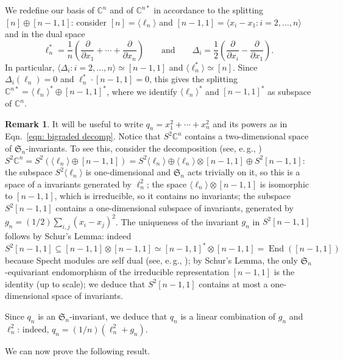 \documentclass[11pt]{article}
\numberwithin{equation}{section}
\theoremstyle{definition}
\newtheorem{remark}[theorem]{Remark}
\theoremstyle{plain}
\newcommand{\eg}{e.\,g.}
\newcommand{\vvirg}{ , \dots , }
\newcommand{\bbC}{\mathbb{C}}
\newcommand{\frakS}{\mathfrak{S}}
\DeclareMathOperator{\End}{End}
\begin{document}
We redefine our basis of $\bbC^n$ and of $\bbC^{n*}$ in accordance to the splitting $[n] \oplus [n-1,1]$: consider $[n] = \langle \ell_n\rangle$ and $[n-1,1] = \langle x_i - x_1 : i = 2 \vvirg n\rangle$ and in the dual space
\[
  \ell_n^* = \frac{1}{n} \left(\frac{\partial }{\partial x_1 } + \cdots + \frac{\partial }{\partial x_n } \right)\qquad\text{and}\qquad \Delta_{i} = \frac{1}{2} \left(\frac{\partial}{\partial x_i} -\frac{\partial}{\partial x_1}\right).
\]
In particular,
$\langle \Delta_i : i = 2 \vvirg n\rangle \simeq [n-1,1]$ and
$\langle \ell_n^* \rangle \simeq [n]$. Since $\Delta_i ( \ell_n ) = 0$
and $\ell_n^* \cdot [n-1,1] = 0$, this gives the splitting
$\bbC^{n*} = \langle \ell_n \rangle ^* \oplus [n-1,1]^*$, where we
identify $\langle \ell_n \rangle ^*$ and $[n-1,1]^*$ as subspace of
$\bbC^n$.
 

\begin{remark}\label{rmk: write q as ell plus g}
  It will be useful to write $q_n = x_1 ^2 + \cdots + x_n^2$ and its powers as in Eqn.~\eqref{eqn: bigraded decomp}. Notice that $S^2 \bbC^n$ contains a two-dimensional space of $\frakS_n$-invariants. To see this, consider the decomposition
(see, \eg, \cite[Eqn.~(6.7.1)]{Lan:TensorBook}) $S^2 \bbC^n = S^2 (\langle \ell_n\rangle \oplus [n-1,1] ) = S^2 \langle \ell_n \rangle \oplus \langle \ell_n \rangle \otimes [n-1,1] \oplus S^2 [n-1,1]$:  the subspace $S^2 \langle \ell_n \rangle$ is one-dimensional and $\frakS_n$ acts trivially on it, so this is a space of a invariants generated by $\ell_n^2$; the space $ \langle \ell_n \rangle \otimes [n-1,1]$ is isomorphic to $[n-1,1]$, which is irreducible, so it contains no invariants; the subspace $ S^2 [n-1,1]$ contains a one-dimensional subspace of invariants, generated by $g_n = ({1}/{2})\sum_{i,j} (x_i - x_j)^2$. The uniqueness of the invariant $g_n$ in $S^2 [n-1,1]$ follows by Schur's Lemma: indeed $S^2 [n-1,1] \subseteq [n-1,1] \otimes [n-1,1] \simeq [n-1,1]^* \otimes [n-1,1] = \End ([n-1,1])$ because 
Specht modules are self dual (see, \eg, \cite[Ch. 4]{FulHar:RepTh}); by Schur's Lemma, the only $\frakS_n$-equivariant endomorphism of the irreducible representation $[n-1,1]$ is the identity (up to scale); we deduce that $S^2 [n-1,1]$ contains at most a one-dimensional space of invariants.

Since $q_n$ is an $\frakS_n$-invariant, we deduce that $q_n$ is a linear combination of $g_n$ and $\ell_n^2$: indeed, $q_n = ({1}/{n})( \ell_n^2 + g_n)$.
\end{remark}

We can now prove the following result. 
\end{document}
